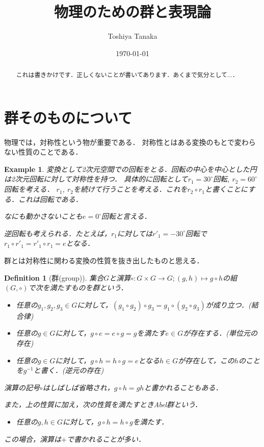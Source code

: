 \documentclass[dvipdfmx, a4paper, english]{jsarticle}
\title{物理のための群と表現論}
\author{Toshiya Tanaka}
\date{\today}
\theoremstyle{break}
\newtheorem{defn}[thm]{Definition}
\newtheorem{eg}[thm]{Example}
\newcommand{\R}{\mathbb{R}}
\newcommand{\C}{\mathbb{C}}
\newcommand{\Z}{\mathbb{Z}}
\newcommand{\hilb}{\mathcal{H}}
\numberwithin{equation}{section}
\begin{document}
	\maketitle
	\begin{abstract}
			これは書きかけです．正しくないことが書いてあります．あくまで気分として...．
	\end{abstract}
	\section{群そのものについて}
	物理では，対称性という物が重要である．
	対称性とはある変換のもとで変わらない性質のことである．

	\begin{eg}

			変換として2次元空間での回転をとる．回転の中心を中心とした円は2次元回転に対して対称性を持つ．
			具体的に回転として$r_1 = 30^{\circ}$回転, $r_2 = 60^{\circ}$回転を考える．
			$r_1$, $r_2$を続けて行うことを考える．これを$r_2 \circ r_1 $と書くことにする．これは回転である．
		
			なにも動かさないことも$e = 0^{\circ}$回転と言える．
		
			逆回転も考えられる．たとえば，$r_1$に対しては$r'_1 = -30^{\circ}$回転で$r_1\circ r'_1 = r'_1\circ r_1 = e$となる．
	\end{eg}

	群とは対称性に関わる変換の性質を抜き出したものと思える．

	\begin{defn}[群(group)]
			集合$G$と演算$\circ \colon G \times G \to G; (g, h)\mapsto g\circ h$の組$(G, \circ)$で次を満たすものを群という．
			\begin{itemize}
					\item 任意の$g_1, g_2, g_3 \in G$に対して，$(g_1 \circ g_2)\circ g_3 = g_1 \circ (g_2 \circ g_3)$が成り立つ．(結合律)
					\item 任意の$g\in G$に対して，$g\circ e = e \circ g = g$を満たす$e\in G$が存在する．(単位元の存在)
					\item 任意の$g\in G$に対して，$g\circ h = h\circ g = e$となる$h\in G$が存在して，この$h$のことを$g^{-1}$と書く．(逆元の存在)
			\end{itemize}

			演算の記号$\circ$はしばしば省略され，$g \circ h = gh$と書かれることもある．

			また，上の性質に加え，次の性質を満たすときAbel群という．
			\begin{itemize}
					\item 任意の$g, h \in G$に対して，$g \circ h = h \circ g$を満たす．
			\end{itemize}
			この場合，演算は$+$で書かれることが多い．
	\end{defn}
\end{document}
